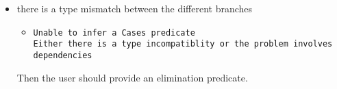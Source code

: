 \begin{itemize}
\item there is a type mismatch between the different branches

  \begin{itemize}
  \item {\tt Unable to infer a Cases predicate\\
Either there is a type incompatiblity or the problem involves dependencies}
  \end{itemize}

  Then the user should provide an elimination predicate.








\end{itemize}

